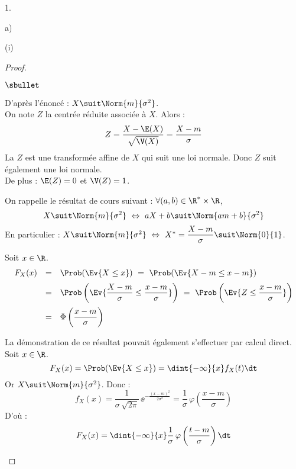 \begin{noliste}{1.}
\begin{noliste}{a)}
\begin{nonoliste}{(i)}
      \begin{proof}~
        \begin{noliste}{$\sbullet$}
	  \item D'après l'énoncé : $X \suit \Norm{m}{\sigma^2}$.\\
	  On note $Z$ la \var centrée réduite associée à $X$.
	  Alors :
	  \[
	    Z = \dfrac{X-\E(X)}{\sqrt{\V(X)}} = \dfrac{X-m}{
	    \sigma}
	  \]
	  La \var $Z$ est une transformée affine de $X$ qui 
	  suit une loi normale. Donc $Z$ suit également
	  une loi normale.\\
	  De plus : $\E(Z)=0$ et $\V(Z)=1$.
	  
	  \begin{remark}
	    On rappelle le résultat de cours suivant : $\forall
	    (a,b) \in \R^* \times \R$,
	    \[
	      X \suit \Norm{m}{\sigma^2} \ \Leftrightarrow \
	      aX+b \suit \Norm{am+b}{\sigma^2}
	    \]
	    En particulier : $X \suit \Norm{m}{\sigma^2} \
	    \Leftrightarrow \ X^* = \dfrac{X-m}{\sigma} \suit
	    \Norm{0}{1}$.
	  \end{remark}

	  
	  \item Soit $x\in \R$.
	  \[
	  \begin{array}{rcl}
	    F_X(x) &=& \Prob(\Ev{X \leq x}) \ = \ \Prob(\Ev{
	    X-m \leq x-m})
	    \\[.2cm]
	    &=& \Prob\left(\Ev{\dfrac{X-m}{\sigma} \leq 
	    \dfrac{x-m}{\sigma}}\right) \ = \ \Prob\left(\Ev{
	    Z \leq \dfrac{x-m}{\sigma}}\right)
	    \\[.4cm]
	    &=& \Phi \left(\dfrac{x-m}{\sigma}\right)
	  \end{array}
	  \]
        \end{noliste}
        
        \begin{remark}
          La démonstration de ce résultat pouvait également 
          s'effectuer par calcul direct.\\
          Soit $x\in \R$.
          \[
            F_X(x) = \Prob(\Ev{X \leq x}) = \dint{-\infty}{x}
            f_X(t) \dt
          \]
          Or $X \suit \Norm{m}{\sigma^2}$. Donc :
          \[
            f_X(x) = \dfrac{1}{\sigma \, \sqrt{2 \pi}} \,
            \ee^{-\frac{(x-m)^2}{2 \sigma^2}} = \dfrac{1}{\sigma}
            \, \varphi\left(\dfrac{x-m}{\sigma}\right)
          \]
          D'où :
          \[
            F_X(x) = \dint{-\infty}{x} \dfrac{1}{\sigma} \,
            \varphi\left(\dfrac{t-m}{\sigma}\right) \dt
          \]
          \end{remark}
          

\end{proof}
\end{nonoliste}
\end{noliste}
\end{noliste}
